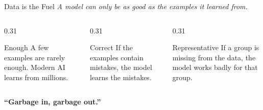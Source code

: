 \begin{frame}{Data is the Fuel}
    \textit{A model can only be as good as the examples it learned from.}

    \vspace{1em}
    \begin{columns}[T]
        \begin{column}{0.31\textwidth}
            \begin{block}{Enough}
                \small A few examples are rarely enough. Modern AI learns from millions.
            \end{block}
        \end{column}
        \begin{column}{0.31\textwidth}
            \begin{block}{Correct}
                \small If the examples contain mistakes, the model learns the mistakes.
            \end{block}
        \end{column}
        \begin{column}{0.31\textwidth}
            \begin{block}{Representative}
                \small If a group is missing from the data, the model works badly for that group.
            \end{block}
        \end{column}
    \end{columns}

    \vspace{1em}
    \centering
    \textbf{``Garbage in, garbage out.''}
\end{frame}
